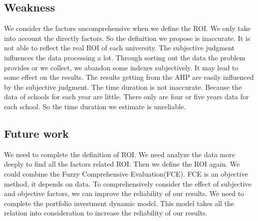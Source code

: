 \documentclass{mcmthesis}
\begin{document}
\subsection{Weakness}
We consider the factors uncomprehensive when we define the ROI. We only take into account the directly factors. So the definition we propose is inaccurate. It is not able to reflect the real ROI of each university.
The subjective judgment influences the data processing a lot. Through sorting out the data the problem provides or we collect, we abandon some indexes subjectively. It may lead to some effect on the results.
The results getting from the AHP are easily influenced by the subjective judgment. 
The time duration is not inaccurate. Because the data of schools for each year are little. There only are four or five years data for each school. So the time duration we estimate is unreliable.
\subsection{Future work }
We need to complete the definition of ROI. We need analyze the data more deeply to find all the factors related ROI. Then we define the ROI again.
We could combine the Fuzzy Comprehensive Evaluation(FCE). FCE is an objective method, it depends on data. To comprehensively consider the effect of subjective and objective factors, we can improve the reliability of our results.
We need to complete the portfolio investment dynamic model. This model takes all the relation into consideration to increase the reliability of our results. 
\end{document}
